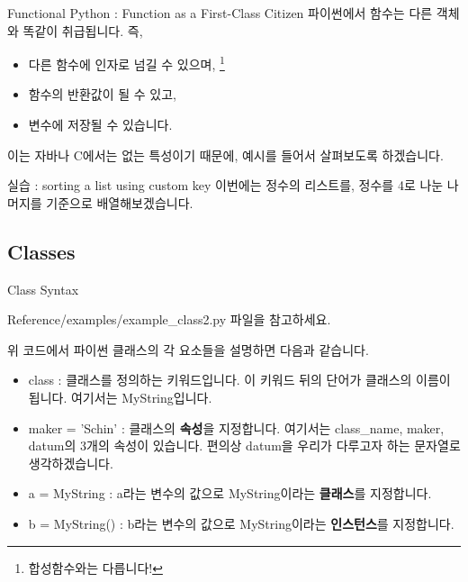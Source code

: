 \documentclass{beamer}
\begin{document}
\begin{frame}[fragile]{Functional Python : Function as a First-Class Citizen}
파이썬에서 함수는 다른 객체와 똑같이 취급됩니다. 즉, 
\begin{itemize} 
\item 다른 함수에 인자로 넘길 수 있으며, \footnote{합성함수와는 다릅니다!}
\item 함수의 반환값이 될 수 있고, 
\item 변수에 저장될 수 있습니다. 
\end{itemize}

이는 자바나 C에서는 없는 특성이기 때문에, 예시를 들어서 살펴보도록 하겠습니다. 
\end{frame}

\begin{frame}{실습 : sorting a list using custom key} 
이번에는 정수의 리스트를, 정수를 4로 나눈 나머지를 기준으로 배열해보겠습니다. 
\end{frame}


\subsection{Classes} 

\begin{frame}[fragile]{Class Syntax}


Reference/examples/example\_class2.py 파일을 참고하세요. 
\end{frame}
\begin{frame}
위 코드에서 파이썬 클래스의 각 요소들을 설명하면 다음과 같습니다. 
\begin{itemize} 
\item class : 클래스를 정의하는 키워드입니다. 이 키워드 뒤의 단어가 클래스의 이름이 됩니다. 여기서는 MyString입니다. 
\item maker = 'Schin' : 클래스의 \textbf{속성}을 지정합니다. 여기서는 class\_name, maker, datum의 3개의 속성이 있습니다. 편의상 datum을 우리가 다루고자 하는 문자열로 생각하겠습니다. 
\item a = MyString : a라는 변수의 값으로 MyString이라는 \textbf{클래스}를 지정합니다. 
\item b = MyString() : b라는 변수의 값으로 MyString이라는 \textbf{인스턴스}를 지정합니다. 
\end{itemize}
\end{frame}
\end{document}
